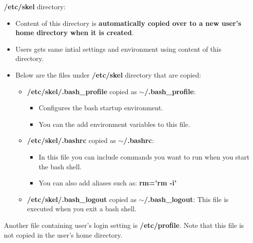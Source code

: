 \setlength{\columnsep}{3pt}
\begin{flushleft}

\textbf{/etc/skel} directory:
\begin{itemize}
	\item Content of this directory is \textbf{automatically copied over to a new user's home directory when it is created}.
	\item Users gets same intial settings and environment using content of this directory.
	\item Below are the files under \textbf{/etc/skel} directory that are copied:
	\begin{itemize}
		\item \textbf{/etc/skel/.bash\_profile} copied as \textbf{{$\sim$}/.bash\_profile}: 
		\begin{itemize}
			\item Configures the bash startup environment.
			\item You can the add environment variables to this file.
		\end{itemize}
		\bigskip
		\item \textbf{/etc/skel/.bashrc} copied as \textbf{{$\sim$}/.bashrc}: 
		\begin{itemize}
			\item In this file you can include commands you want to run when you start the bash shell.
			\item You can also add aliases such as: \textbf{rm='rm -i'}
		\end{itemize}
		\bigskip
		\item \textbf{/etc/skel/.bash\_logout} copied as \textbf{{$\sim$}/.bash\_logout}: 
		\newline
		This file is executed when you exit a bash shell.
	\end{itemize}	
	\bigskip
	
\end{itemize}

Another file containing user's login setting is \textbf{/etc/profile}. Note that this file is not copied in the user's home directory.





	
\end{flushleft}

\newpage

